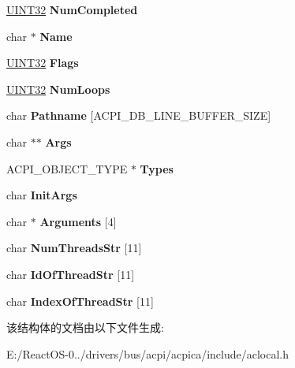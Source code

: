 \begin{DoxyCompactItemize}
\item 
\mbox{\label{structacpi__db__method__info_a78565c9ba16e6e313dca7b2f6eaf8e7c}} 
\hyperlink{_processor_bind_8h_ae1e6edbbc26d6fbc71a90190d0266018}{U\+I\+N\+T32} {\bfseries Num\+Completed}
\item 
\mbox{\label{structacpi__db__method__info_ac8e5ddc363d098e842be01207a1391f4}} 
char $\ast$ {\bfseries Name}
\item 
\mbox{\label{structacpi__db__method__info_a1598eb9b6b241f465def284fb63d5984}} 
\hyperlink{_processor_bind_8h_ae1e6edbbc26d6fbc71a90190d0266018}{U\+I\+N\+T32} {\bfseries Flags}
\item 
\mbox{\label{structacpi__db__method__info_a3761a660c8bcef7ca66bd6442102d87d}} 
\hyperlink{_processor_bind_8h_ae1e6edbbc26d6fbc71a90190d0266018}{U\+I\+N\+T32} {\bfseries Num\+Loops}
\item 
\mbox{\label{structacpi__db__method__info_a8ddd01cc83307967893149e8bdf62c3e}} 
char {\bfseries Pathname} \mbox{[}A\+C\+P\+I\+\_\+\+D\+B\+\_\+\+L\+I\+N\+E\+\_\+\+B\+U\+F\+F\+E\+R\+\_\+\+S\+I\+ZE\mbox{]}
\item 
\mbox{\label{structacpi__db__method__info_af24355f13a205cbcc4e5074bfbde4611}} 
char $\ast$$\ast$ {\bfseries Args}
\item 
\mbox{\label{structacpi__db__method__info_ad2590cd8f98919f65c09e2503e7a1fbf}} 
A\+C\+P\+I\+\_\+\+O\+B\+J\+E\+C\+T\+\_\+\+T\+Y\+PE $\ast$ {\bfseries Types}
\item 
\mbox{\label{structacpi__db__method__info_a79b90ca085198fe1e046810d9023652e}} 
char {\bfseries Init\+Args}
\item 
\mbox{\label{structacpi__db__method__info_a59f764d71c3995df172c16ea4ec9a932}} 
char $\ast$ {\bfseries Arguments} \mbox{[}4\mbox{]}
\item 
\mbox{\label{structacpi__db__method__info_a2442af422879ac30dd632d13c7c5fc98}} 
char {\bfseries Num\+Threads\+Str} \mbox{[}11\mbox{]}
\item 
\mbox{\label{structacpi__db__method__info_ae4bbda1ba9e4b235059bf81850a5b6fb}} 
char {\bfseries Id\+Of\+Thread\+Str} \mbox{[}11\mbox{]}
\item 
\mbox{\label{structacpi__db__method__info_a533f364c46db69454301101b639ad1ca}} 
char {\bfseries Index\+Of\+Thread\+Str} \mbox{[}11\mbox{]}
\end{DoxyCompactItemize}


该结构体的文档由以下文件生成\+:\begin{DoxyCompactItemize}
\item 
E\+:/\+React\+O\+S-\/0../drivers/bus/acpi/acpica/include/aclocal.\+h\end{DoxyCompactItemize}
